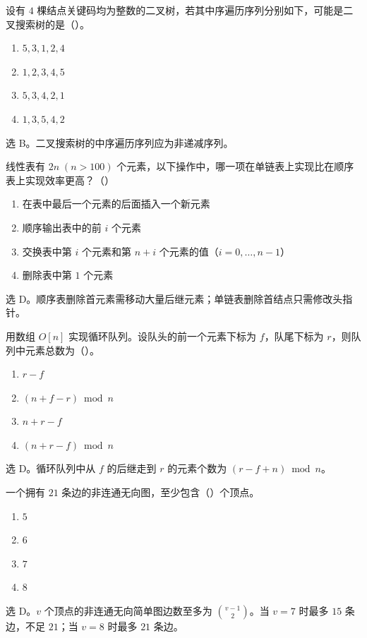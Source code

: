 \begin{question}
设有 $4$ 棵结点关键码均为整数的二叉树，若其中序遍历序列分别如下，可能是二叉搜索树的是（\quad）。
\begin{enumerate}
  \item $5,3,1,2,4$
  \item $1,2,3,4,5$
  \item $5,3,4,2,1$
  \item $1,3,5,4,2$
\end{enumerate}
\begin{solution}
选 B。二叉搜索树的中序遍历序列应为非递减序列。
\end{solution}
\end{question}

\begin{question}
线性表有 $2n\;(n>100)$ 个元素，以下操作中，哪一项在单链表上实现比在顺序表上实现效率更高？（\quad）
\begin{enumerate}
  \item 在表中最后一个元素的后面插入一个新元素
  \item 顺序输出表中的前 $i$ 个元素
  \item 交换表中第 $i$ 个元素和第 $n+i$ 个元素的值（$i=0,\ldots,n-1$）
  \item 删除表中第 $1$ 个元素
\end{enumerate}
\begin{solution}
选 D。顺序表删除首元素需移动大量后继元素；单链表删除首结点只需修改头指针。
\end{solution}
\end{question}

\begin{question}
用数组 $O[n]$ 实现循环队列。设队头的前一个元素下标为 $f$，队尾下标为 $r$，则队列中元素总数为（\quad）。
\begin{enumerate}
  \item $r-f$
  \item $(n+f-r)\bmod n$
  \item $n+r-f$
  \item $(n+r-f)\bmod n$
\end{enumerate}
\begin{solution}
选 D。循环队列中从 $f$ 的后继走到 $r$ 的元素个数为 $(r-f+n)\bmod n$。
\end{solution}
\end{question}

\begin{question}
一个拥有 $21$ 条边的非连通无向图，至少包含（\quad）个顶点。
\begin{enumerate}
  \item $5$
  \item $6$
  \item $7$
  \item $8$
\end{enumerate}
\begin{solution}
选 D。$v$ 个顶点的非连通无向简单图边数至多为 $\binom{v-1}{2}$。当 $v=7$ 时最多 $15$ 条边，不足 $21$；当 $v=8$ 时最多 $21$ 条边。
\end{solution}
\end{question}

